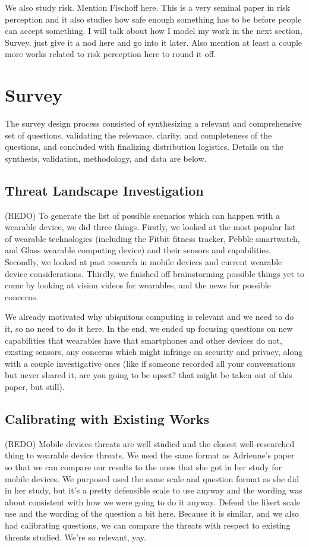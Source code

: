 \documentclass{acm_proc_article-sp}
\begin{document}
We also study risk. Mention Fischoff here. This is a very seminal paper in risk perception and it also studies how safe enough something has to be before people can accept something. I will talk about how I model my work in the next section, Survey, just give it a nod here and go into it later. Also mention at least a couple more works related to risk perception here to round it off. 


\section{Survey}
The survey design process consisted of synthesizing a relevant and comprehensive set of questions, validating the relevance, clarity, and completeness of the questions, and concluded with finalizing distribution logistics. Details on the synthesis, validation, methodology, and data are below.

\subsection{Threat Landscape Investigation} 
(REDO) To generate the list of possible scenarios which can happen with a wearable device, we did three things. Firstly, we looked at the most popular list of wearable technologies (including the Fitbit fitness tracker, Pebble smartwatch, and Glass wearable computing device) and their sensors and capabilities. Secondly, we looked at past research in mobile devices and current wearable device considerations. Thirdly, we finished off brainstorming possible things yet to come by looking at vision videos for wearables, and the news for possible concerns. 

We already motivated why ubiquitous computing is relevant and we need to do it, so no need to do it here. In the end, we ended up focusing questions on new capabilities that wearables have that smartphones and other devices do not, existing sensors, any concerns which might infringe on security and privacy, along with a couple investigative ones (like if someone recorded all your conversations but never shared it, are you going to be upset? that might be taken out of this paper, but still). 

\subsection{Calibrating with Existing Works}
(REDO) Mobile devices threats are well studied and the closest well-researched thing to wearable device threats. We used the same format as Adrienne's paper so that we can compare our results to the ones that she got in her study for mobile devices. We purposed used the same scale and question format as she did in her study, but it's a pretty defensible scale to use anyway and the wording was about consistent with how we were going to do it anyway. Defend the likert scale use and the wording of the question a bit here. Because it is similar, and we also had calibrating questions, we can compare the threats with respect to existing threats studied. We're so relevant, yay. 
\end{document}
